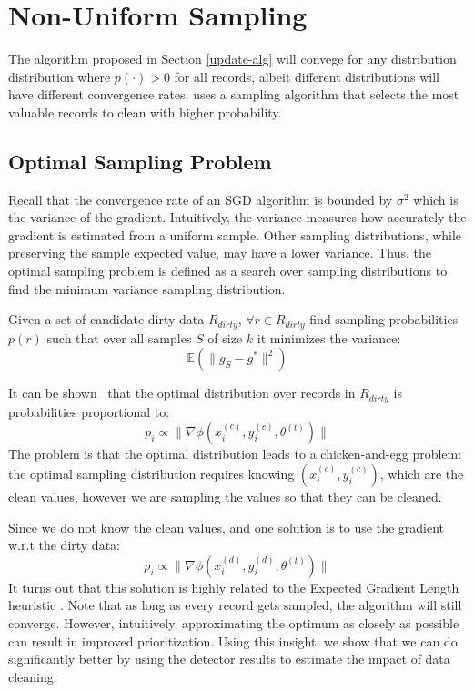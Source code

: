 \section{Non-Uniform Sampling}\label{dist-samp}
The algorithm proposed in Section \ref{update-alg} will convege for 
any distribution distribution where  $p(\cdot) > 0$ for all records, albeit different distributions will have different convergence rates.
\sys uses a sampling algorithm that selects the most valuable records to clean with higher probability. 

\subsection{Optimal Sampling Problem}
Recall that the convergence rate of an SGD algorithm is bounded by $\sigma^2$ which is the variance of the gradient.
Intuitively, the variance measures how accurately the gradient is estimated from a uniform sample.
Other sampling distributions, while preserving the sample expected value, may have a lower variance.
Thus, the optimal sampling problem is defined as a search over sampling distributions to find the minimum variance sampling distribution.

\begin{definition}
Given a set of candidate dirty data $R_{dirty}$, $\forall r \in R_{dirty}$ find sampling probabilities $p(r)$ such that over all samples $S$ of size $k$ it minimizes the variance:
\[
\mathbb{E}(\|g_S - g^*\|^2)
\]
\end{definition}

It can be shown~\cite{zhao2014stochastic} that the optimal distribution over records in $R_{dirty}$ is probabilities proportional to:
\[
p_i \propto \|\nabla\phi(x^{(c)}_i,y^{(c)}_i,\theta^{(t)})\|
\]
The problem is that the optimal distribution leads to a chicken-and-egg problem:
the optimal sampling distribution requires knowing $(x^{(c)}_i,y^{(c)}_i)$, which are the clean values, however we are sampling the values so that they can be cleaned.

Since we do not know the clean values, and one solution is to use the gradient w.r.t the dirty data:
\[
p_i \propto \|\nabla\phi(x^{(d)}_i,y^{(d)}_i,\theta^{(t)})\|
\]
It turns out that this solution is highly related to the Expected Gradient Length heuristic \cite{settles2010active}.
Note that as long as every record gets sampled, the algorithm will still converge.
However, intuitively, approximating the optimum as closely as possible can result in improved prioritization. 
Using this insight, we show that we can do significantly better by using the detector results to estimate the impact of data cleaning.





